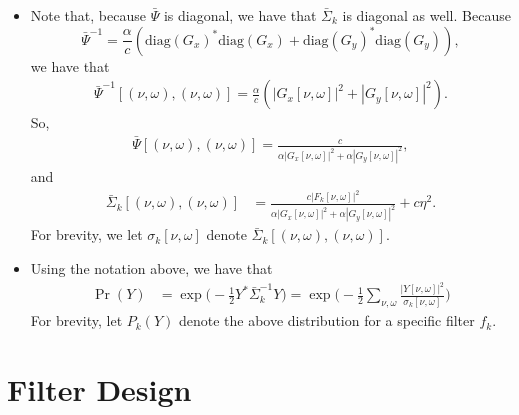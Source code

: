 \documentclass[10pt]{article}
\newcommand{\diag}{\mathrm{diag}}
\begin{document}
\begin{itemize}
  \item Note that, because $\bar{\Psi}$ is diagonal, we have that $\bar{\Sigma}_k$ is diagonal as well. Because $$\bar{\Psi}^{-1} = \frac{\alpha}{c} (\diag(G_x)^* \diag(G_x) + \diag(G_y)^* \diag(G_y)),$$
  we have that
  \begin{align*}
    \bar{\Psi}^{-1}[(\nu,\omega), (\nu,\omega)] = \frac{\alpha}{c}( | G_x[\nu,\omega] |^2 + | G_y[\nu, \omega] |^2).
  \end{align*}
  So, 
  \begin{align*}
    \bar{\Psi}[(\nu,\omega), (\nu,\omega)] = \frac{c}{\alpha| G_x[\nu,\omega] |^2 + \alpha | G_y[\nu, \omega] |^2 },
  \end{align*}
  and
  \begin{align*}
    \bar{\Sigma}_k[(\nu,\omega), (\nu,\omega)]
    &= \frac{c |F_k[\nu, \omega]|^2 }{\alpha| G_x[\nu,\omega] |^2 + \alpha | G_y[\nu, \omega] |^2 } + c\eta^2.
  \end{align*}
  For brevity, we let $\sigma_k[\nu, \omega]$ denote $\bar{\Sigma}_k[(\nu,\omega), (\nu,\omega)]$.
  
  \item Using the notation above, we have that
  \begin{align*}
    \Pr(Y) 
    &= \exp\bigg(-\frac{1}{2} Y^* \bar{\Sigma}_k^{-1} Y \bigg)
    = \exp\bigg( -\frac{1}{2} \sum_{\nu,\omega} \frac{| Y[\nu, \omega] |^2}{\sigma_k[\nu, \omega] } \bigg)
  \end{align*}
  For brevity, let $P_k(Y)$ denote the above distribution for a specific filter $f_k$.
\end{itemize}


\section{Filter Design}\label{sec:filter_design} %
\end{document}
